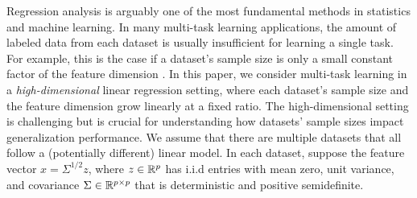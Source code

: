 
Regression analysis is arguably one of the most fundamental methods in statistics and machine learning.
In many multi-task learning applications, the amount of labeled data from each dataset is usually insufficient for learning a single task.
For example, this is the case if a dataset's sample size is only a small constant factor of the feature dimension \cite{GLUE}.
In this paper, we consider multi-task learning in a \textit{high-dimensional} linear regression setting, where each dataset's sample size and the feature dimension grow linearly at a fixed ratio.
The high-dimensional setting is challenging but is crucial for understanding how datasets' sample sizes impact generalization performance.
We assume that there are multiple datasets that all follow a (potentially different) linear model.
In each dataset, suppose the feature vector $x = {\Sigma}^{1/2} z$, where $z \in \mathbb{R}^p$ has i.i.d entries with mean zero, unit variance, and covariance $\Sigma \in\mathbb{R}^{p \times p}$ that is deterministic and positive semidefinite.

